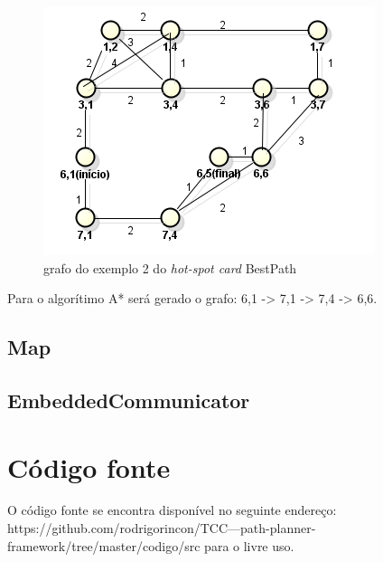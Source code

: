 \begin{anexosenv}
\begin{figure}[h]
	\centering
	\label{figXX3}
		\includegraphics[keepaspectratio=true,scale=0.7]{figuras/grafohotspotcard2.PNG}
	\caption{grafo do exemplo 2 do \textit{hot-spot card} BestPath}
\end{figure}

Para o algorítimo A* será gerado o grafo: 6,1 -> 7,1 -> 7,4 -> 6,6.

\section{Map}

\section{EmbeddedCommunicator}

\chapter{Código fonte}

O código fonte se encontra disponível no seguinte endereço: https://github.com/rodrigorincon/TCC---path-planner-framework/tree/master/codigo/src para o livre uso.

\end{anexosenv}

